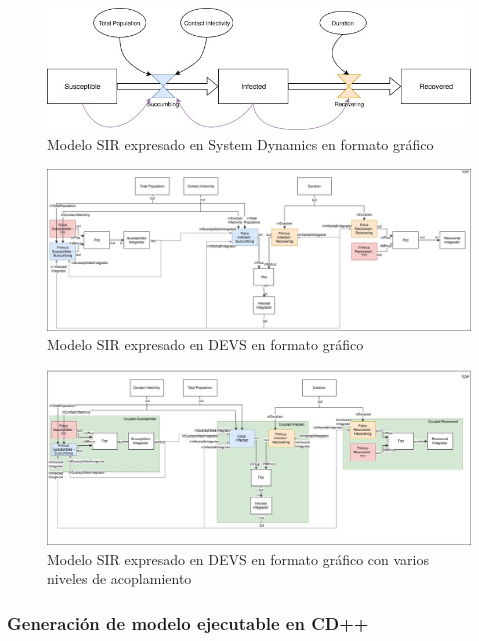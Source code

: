 \begin{figure}[!h]
\centering
\includegraphics[scale=0.5]{imagenes/SIR_sd.jpg}
\caption{Modelo SIR expresado en System Dynamics en formato gráfico}
\label{fig:SIR_sd}
\end{figure}
\begin{figure}[!h]
\centering
\includegraphics[scale=0.3]{imagenes/SIR_devs_flattened.jpg}
\caption{Modelo SIR expresado en DEVS en formato gráfico}
\label{fig:SIR_devs_flattened}
\end{figure}
\begin{figure}[!h]
\centering
\includegraphics[scale=0.3]{imagenes/SIR_devs.jpg}
\caption{Modelo SIR expresado en DEVS en formato gráfico con varios niveles de acoplamiento}
\label{fig:SIR_devs}
\end{figure}

\subsubsection{Generación de modelo ejecutable en CD++}
